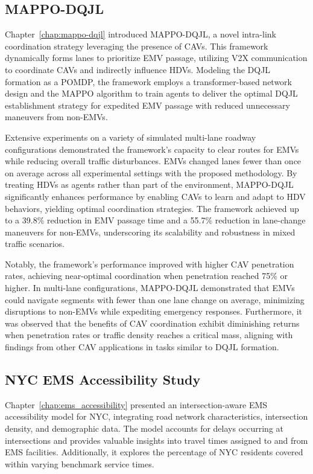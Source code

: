 \subsection{MAPPO-DQJL}
Chapter~\ref{chap:mappo-dqjl} introduced MAPPO-DQJL, a novel intra-link coordination strategy leveraging the presence of CAVs. This framework dynamically forms lanes to prioritize EMV passage, utilizing V2X communication to coordinate CAVs and indirectly influence HDVs. Modeling the DQJL formation as a POMDP, the framework employs a transformer-based network design and the MAPPO algorithm to train agents to deliver the optimal DQJL establishment strategy for expedited EMV passage with reduced unnecessary maneuvers from non-EMVs.

Extensive experiments on a variety of simulated multi-lane roadway configurations demonstrated the framework's capacity to clear routes for EMVs while reducing overall traffic disturbances. EMVs changed lanes fewer than once on average across all experimental settings with the proposed methodology. By treating HDVs as agents rather than part of the environment, MAPPO-DQJL significantly enhances performance by enabling CAVs to learn and adapt to HDV behaviors, yielding optimal coordination strategies. The framework achieved up to a 39.8\% reduction in EMV passage time and a 55.7\% reduction in lane-change maneuvers for non-EMVs, underscoring its scalability and robustness in mixed traffic scenarios.

Notably, the framework's performance improved with higher CAV penetration rates, achieving near-optimal coordination when penetration reached 75\% or higher. In multi-lane configurations, MAPPO-DQJL demonstrated that EMVs could navigate segments with fewer than one lane change on average, minimizing disruptions to non-EMVs while expediting emergency responses. Furthermore, it was observed that the benefits of CAV coordination exhibit diminishing returns when penetration rates or traffic density reaches a critical mass, aligning with findings from other CAV applications in tasks similar to DQJL formation.

\subsection{NYC EMS Accessibility Study}
Chapter~\ref{chap:ems_accessibility} presented an intersection-aware EMS accessibility model for NYC, integrating road network characteristics, intersection density, and demographic data. The model accounts for delays occurring at intersections and provides valuable insights into travel times assigned to and from EMS facilities. Additionally, it explores the percentage of NYC residents covered within varying benchmark service times.

